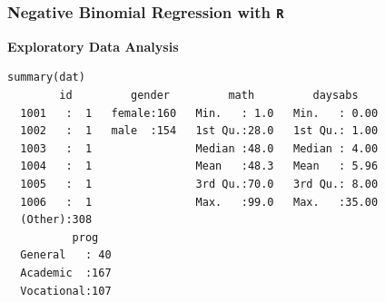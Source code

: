 \documentclass[00-GLMregslides.tex]{subfiles}
\begin{document}


\begin{frame}[fragile]
\frametitle{Negative Binomial Regression with \texttt{R} }
\normalsize
\textbf{Exploratory Data Analysis}
\begin{framed}
\begin{verbatim}	
summary(dat)
        id         gender         math         daysabs     
  1001   :  1   female:160   Min.   : 1.0   Min.   : 0.00  
  1002   :  1   male  :154   1st Qu.:28.0   1st Qu.: 1.00  
  1003   :  1                Median :48.0   Median : 4.00  
  1004   :  1                Mean   :48.3   Mean   : 5.96  
  1005   :  1                3rd Qu.:70.0   3rd Qu.: 8.00  
  1006   :  1                Max.   :99.0   Max.   :35.00  
  (Other):308                                              
          prog    
  General   : 40  
  Academic  :167  
  Vocational:107  
\end{verbatim}	
\end{framed}

	
               
\end{frame}
\end{document}
